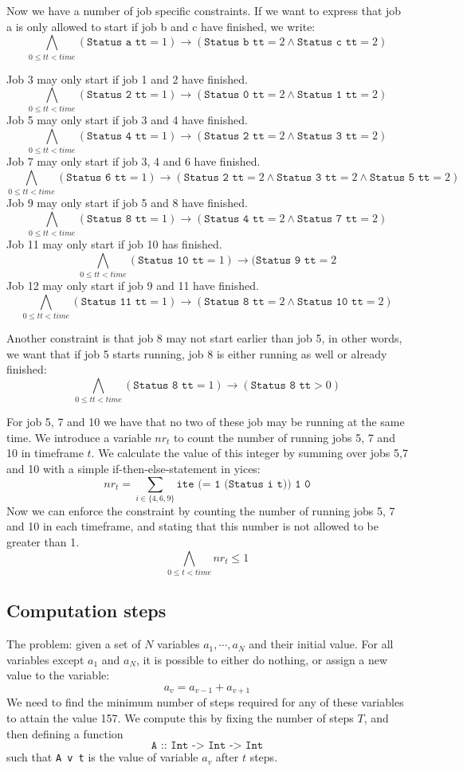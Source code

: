 \documentclass[12pt]{article}
\begin{document}
Now we have a number of job specific constraints. 
If we want to express that job a is only allowed to start if job b and c have finished, we write: 
\[ \bigwedge_{0 \le tt < time} (\texttt{Status a tt} = 1) \rightarrow (\texttt{Status b tt} = 2 \wedge \texttt{Status c tt} = 2) \]

Job 3 may only start if job 1 and 2 have finished.
\[ \bigwedge_{0 \le tt < time} (\texttt{Status 2 tt} = 1) \rightarrow (\texttt{Status 0 tt} = 2 \wedge \texttt{Status 1 tt} = 2) \]
Job 5 may only start if job 3 and 4 have finished.
\[ \bigwedge_{0 \le tt < time} (\texttt{Status 4 tt} = 1) \rightarrow (\texttt{Status 2 tt} = 2 \wedge \texttt{Status 3 tt} = 2) \]
Job 7 may only start if job 3, 4 and 6 have finished.
\[ \bigwedge_{0 \le tt < time} (\texttt{Status 6 tt} = 1) \rightarrow (\texttt{Status 2 tt} = 2 \wedge \texttt{Status 3 tt} = 2 \wedge \texttt{Status 5 tt} = 2) \]
Job 9 may only start if job 5 and 8 have finished.
\[ \bigwedge_{0 \le tt < time} (\texttt{Status 8 tt} = 1) \rightarrow (\texttt{Status 4 tt} = 2 \wedge \texttt{Status 7 tt} = 2) \]
Job 11 may only start if job 10 has finished.
\[ \bigwedge_{0 \le tt < time} (\texttt{Status 10 tt} = 1) \rightarrow (\texttt{Status 9 tt} = 2\]
Job 12 may only start if job 9 and 11 have finished.
\[ \bigwedge_{0 \le tt < time} (\texttt{Status 11 tt} = 1) \rightarrow (\texttt{Status 8 tt} = 2 \wedge \texttt{Status 10 tt} = 2) \]

Another constraint is that job 8 may not start earlier than job 5, in other words, we want that if job 5 starts running, job 8 is either running as well or already finished:
\[ \bigwedge_{0 \le tt < time} (\texttt{Status 8 tt} = 1) \rightarrow (\texttt{Status 8 tt} > 0) \]

For job 5, 7 and 10 we have that no two of these job may be running at the same time. 
We introduce a variable $nr_t$ to count the number of running jobs 5, 7 and 10 in timeframe $t$.
We calculate the value of this integer by summing over jobs 5,7 and 10 with a simple if-then-else-statement in yices: 
\[ nr_t = \sum_{i \in \{4,6,9\}} \texttt{ite (= 1 (Status i t)) 1 0} \]
Now we can enforce the constraint by counting the number of running jobs 5, 7 and 10 in each timeframe, 
and stating that this number is not allowed to be greater than 1. 
\[ \bigwedge_{0 \le t < time} nr_t \le 1\]

\subsection*{Computation steps}
The problem: given a set of $N$ variables $a_1, \cdots, a_N$ and their initial value.
For all variables except $a_1$ and $a_N$, it is possible to either do nothing, or assign a new value to the variable:
\[ a_v = a_{v-1} + a_{v+1} \]
We need to find the minimum number of steps required for any of these variables to attain the value 157.
We compute this by fixing the number of steps $T$, and then defining a function
\[\texttt{A :: Int -> Int -> Int}\]
such that \texttt{A v t} is the value of variable $a_v$ after $t$ steps.
\end{document}
